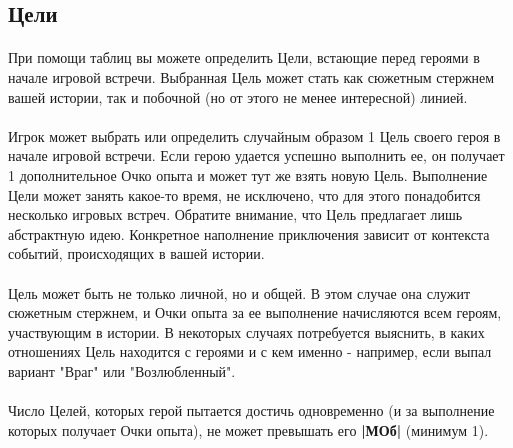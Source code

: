 \subsection{Цели}
\paragraph{}
При помощи таблиц вы можете определить Цели, встающие перед героями в начале игровой встречи. Выбранная Цель может стать как сюжетным стержнем вашей истории, так и побочной (но от этого не менее интересной) линией.
\paragraph{}
Игрок может выбрать или определить случайным образом 1 Цель своего героя в начале игровой встречи. Если герою удается успешно выполнить ее, он получает 1 дополнительное Очко опыта и может тут же взять новую Цель. Выполнение Цели может занять какое-то время, не исключено, что для этого понадобится несколько игровых встреч. Обратите внимание, что Цель предлагает лишь абстрактную идею. Конкретное наполнение приключения зависит от контекста событий, происходящих в вашей истории.
\paragraph{}
Цель может быть не только личной, но и общей. В этом случае она служит сюжетным стержнем, и Очки опыта за ее выполнение начисляются всем героям, участвующим в истории. В некоторых случаях потребуется выяснить, в каких отношениях Цель находится с героями и с кем именно - например, если выпал вариант "Враг" или "Возлюбленный".
\paragraph{}
Число Целей, которых герой пытается достичь одновременно (и за выполнение которых получает Очки опыта), не может превышать его \textbf{|МОб|} (минимум 1).
